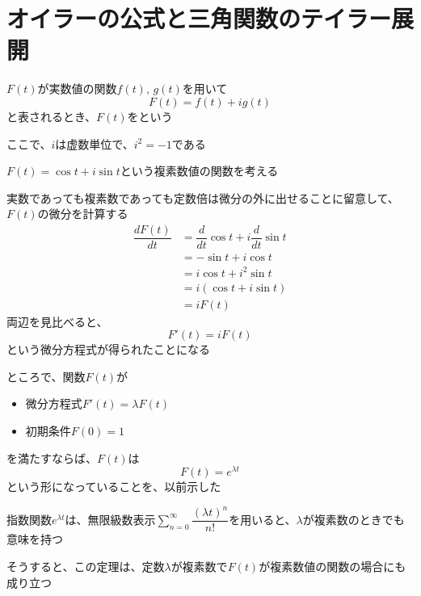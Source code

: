 \documentclass[../book_jiriki_calc]{subfiles}
\begin{document}
\section{オイラーの公式と三角関数のテイラー展開}

$F(t)$が実数値の関数$f(t),\, g(t)$を用いて
\begin{equation}
  F(t) = f(t) + ig(t)
\end{equation}
と表されるとき、$F(t)$をという

ここで、$i$は虚数単位で、$i^2 = -1$である

\sectionline

$F(t) = \cos t + i\sin t$という複素数値の関数を考える

実数であっても複素数であっても定数倍は微分の外に出せることに留意して、$F(t)$の微分を計算する
\begin{align}
  \dfrac{dF(t)}{dt} & = \dfrac{d}{dt}\cos t + i\dfrac{d}{dt}\sin t \\
                    & = -\sin t + i\cos t                          \\
                    & = i\cos t + i^2\sin t                        \\
                    & = i(\cos t + i\sin t)                        \\
                    & = iF(t)
\end{align}
両辺を見比べると、
\begin{equation*}
  F'(t) = iF(t)
\end{equation*}
という微分方程式が得られたことになる

\sectionline

ところで、関数$F(t)$が
\begin{itemize}
  \item 微分方程式$F'(t) = \lambda F(t)$
  \item 初期条件$F(0) = 1$
\end{itemize}
を満たすならば、$F(t)$は
\begin{equation}
  F(t) = e^{\lambda t}
\end{equation}
という形になっていることを、以前示した

\br

指数関数$e^{\lambda t}$は、無限級数表示$\displaystyle\sum_{n=0}^{\infty}\dfrac{(\lambda t)^n}{n!}$を用いると、$\lambda$が複素数のときでも意味を持つ

そうすると、この定理は、定数$\lambda$が複素数で$F(t)$が複素数値の関数の場合にも成り立つ

\br
\end{document}
